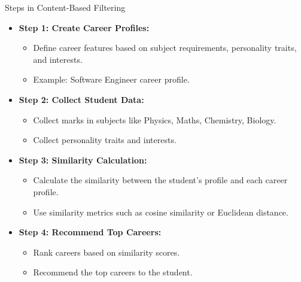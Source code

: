 \documentclass{beamer}
\begin{document}
\begin{frame}{Steps in Content-Based Filtering}
    \begin{itemize}
        \item \textbf{Step 1: Create Career Profiles:}
        \begin{itemize}
            \item Define career features based on subject requirements, personality traits, and interests.
            \item Example: Software Engineer career profile.
        \end{itemize}
        \item \textbf{Step 2: Collect Student Data:}
        \begin{itemize}
            \item Collect marks in subjects like Physics, Maths, Chemistry, Biology.
            \item Collect personality traits and interests.
        \end{itemize}
        \item \textbf{Step 3: Similarity Calculation:}
        \begin{itemize}
            \item Calculate the similarity between the student's profile and each career profile.
            \item Use similarity metrics such as cosine similarity or Euclidean distance.
        \end{itemize}
        \item \textbf{Step 4: Recommend Top Careers:}
        \begin{itemize}
            \item Rank careers based on similarity scores.
            \item Recommend the top careers to the student.
        \end{itemize}
    \end{itemize}
\end{frame}
\end{document}
